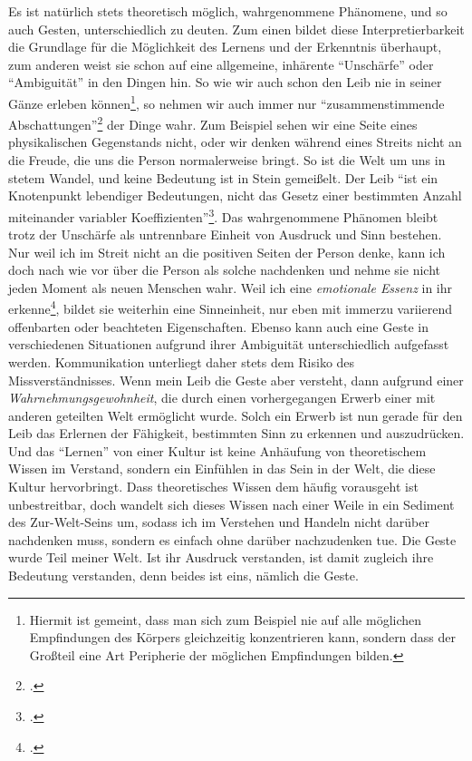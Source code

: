 \documentclass[a4paper, 12pt]{article}
\begin{document}
\begin{onehalfspace}
Es ist natürlich stets theoretisch möglich, wahrgenommene Phänomene, und so auch Gesten, unterschiedlich zu deuten. Zum einen bildet diese Interpretierbarkeit die Grundlage für die Möglichkeit des Lernens und der Erkenntnis überhaupt, zum anderen weist sie schon auf eine allgemeine, inhärente "`Unschärfe"' oder "`Ambiguität"' in den Dingen hin. So wie wir auch schon den Leib nie in seiner Gänze erleben können\footnote{Hiermit ist gemeint, dass man sich zum Beispiel nie auf alle möglichen Empfindungen des Körpers gleichzeitig konzentrieren kann, sondern dass der Großteil eine Art Peripherie der möglichen Empfindungen bilden.}, so nehmen wir auch immer nur "`zusammenstimmende Abschattungen"'\footnote{\Cite[Siehe][S. 220]{merleau1966phanomenologie}.} der Dinge wahr. Zum Beispiel sehen wir eine Seite eines physikalischen Gegenstands nicht, oder wir denken während eines Streits nicht an die Freude, die uns die Person normalerweise bringt. So ist die Welt um uns in stetem Wandel, und keine Bedeutung ist in Stein gemeißelt. Der Leib "`ist ein Knotenpunkt lebendiger Bedeutungen, nicht das Gesetz einer bestimmten Anzahl miteinander variabler Koeffizienten"'\footnote{\Cite[Siehe][S. 182]{merleau1966phanomenologie}.}. Das wahrgenommene Phänomen bleibt trotz der Unschärfe als untrennbare Einheit von Ausdruck und Sinn bestehen. Nur weil ich im Streit nicht an die positiven Seiten der Person denke, kann ich doch nach wie vor über die Person als solche nachdenken und nehme sie nicht jeden Moment als neuen Menschen wahr. Weil ich eine \emph{emotionale Essenz} in ihr erkenne\footnote{\Cite[Vgl.][S. 222]{merleau1966phanomenologie}.}, bildet sie weiterhin eine Sinneinheit, nur eben mit immerzu variierend offenbarten oder beachteten Eigenschaften. Ebenso kann auch eine Geste in verschiedenen Situationen aufgrund ihrer Ambiguität unterschiedlich aufgefasst werden. Kommunikation unterliegt daher stets dem Risiko des Missverständnisses. Wenn mein Leib die Geste aber versteht, dann aufgrund einer \emph{Wahrnehmungsgewohnheit}, die durch einen vorhergegangen Erwerb einer mit anderen geteilten Welt ermöglicht wurde. Solch ein Erwerb ist nun gerade für den Leib das Erlernen der Fähigkeit, bestimmten Sinn zu erkennen und auszudrücken. Und das "`Lernen"' von einer Kultur ist keine Anhäufung von theoretischem Wissen im Verstand, sondern ein Einfühlen in das Sein in der Welt, die diese Kultur hervorbringt. Dass theoretisches Wissen dem häufig vorausgeht ist unbestreitbar, doch wandelt sich dieses Wissen nach einer Weile in ein Sediment des Zur-Welt-Seins um, sodass ich im Verstehen und Handeln nicht darüber nachdenken muss, sondern es einfach ohne darüber nachzudenken tue. Die Geste wurde Teil meiner Welt. Ist ihr Ausdruck verstanden, ist damit zugleich ihre Bedeutung verstanden, denn beides ist eins, nämlich die Geste.


\end{onehalfspace}
\end{document}
